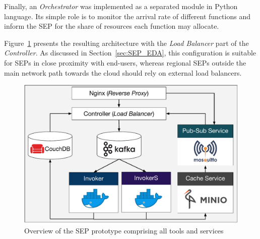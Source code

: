 Finally, an \textit{Orchestrator} was implemented as a separated module in Python language. Its simple role is to monitor the arrival rate of different functions and inform the SEP for the share of resources each function may allocate. 

Figure~\ref{fig:Serverless_Edge_Platform_Overview} presents the resulting architecture with the \textit{Load Balancer} part of the \textit{Controller}. As discussed in Section~\ref{sec:SEP_EDA}, this configuration is suitable for SEPs in close proximity with end-users, whereas regional SEPs outside the main network path towards the cloud should rely on external load balancers. 




\begin{figure}[tbp]
	\centering
	\includegraphics[width=1\linewidth]{Figs/Serverless_Edge_Platform_Prototype.pdf}
	\caption{Overview of the SEP prototype comprising all tools and services}
	\label{fig:Serverless_Edge_Platform_Overview}
\end{figure}







